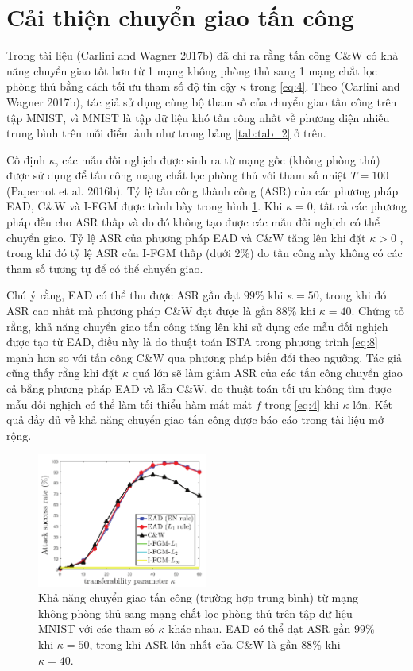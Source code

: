 \section{Cải thiện chuyển giao tấn công}
Trong tài liệu (Carlini and Wagner 2017b) đã chỉ ra rằng tấn công C\&W có khả năng chuyển giao tốt hơn  từ 1 mạng không phòng thủ sang 1 mạng chắt lọc phòng thủ bằng cách tối ưu tham số độ tin cậy $\kappa$ trong \ref{eq:4}. Theo (Carlini and Wagner 2017b), tác giả sử dụng cùng bộ tham số của chuyển giao tấn công trên tập MNIST, vì MNIST là tập dữ liệu khó tấn công nhất về phương diện nhiễu trung bình trên mỗi điểm ảnh như trong bảng \ref{tab:tab_2} ở trên.

Cố định $\kappa$, các mẫu đối nghịch được sinh ra từ mạng gốc (không phòng thủ) được sử dụng để tấn công mạng chắt lọc phòng thủ với tham số nhiệt $T = 100$ (Papernot et al. 2016b). Tỷ lệ tấn công thành công (ASR) của các phương pháp EAD, C\&W và I-FGM được trình bày trong hình \ref{fig:fg_04}. Khi $\kappa = 0$, tất cả các phương pháp đều cho ASR thấp và do đó không tạo được các mẫu đối nghịch có thể chuyển giao. Tỷ lệ ASR của phương pháp EAD và C\&W tăng lên khi đặt $\kappa > 0$ , trong khi đó tỷ lệ ASR của I-FGM thấp (dưới $2\%$) do tấn công này không có các tham số tương tự để có thể chuyển giao.

Chú ý rằng, EAD có thể thu được ASR gần đạt $99\%$ khi $\kappa = 50$, trong khi đó ASR cao nhất mà phương pháp C\&W đạt được là gần $88\%$ khi $\kappa = 40$. Chứng tỏ rằng, khả năng chuyển giao tấn công tăng lên khi sử dụng các mẫu đối nghịch được tạo từ EAD, điều này là do thuật toán ISTA trong phương trình \ref{eq:8} mạnh hơn so với tấn công C\&W qua phương pháp biến đổi theo ngưỡng. Tác giả cũng thấy rằng khi đặt $\kappa$ quá lớn sẽ làm giảm ASR của các tấn công chuyển giao cả bằng phương pháp EAD và lẫn C\&W, do thuật toán tối ưu không tìm được mẫu đối nghịch có thể làm tối thiểu hàm mất mát $f$ trong \ref{eq:4} khi $\kappa$ lớn. Kết quả đầy đủ về khả năng chuyển giao tấn công được báo cáo trong tài liệu mở rộng.

\begin{figure}[H] %
    \centering %
    \includegraphics[width=0.5\textwidth]{assets/fig_04.png} 
    \caption{Khả năng chuyển giao tấn công (trường hợp trung bình) từ mạng không phòng thủ sang mạng chắt lọc phòng thủ  trên tập dữ liệu MNIST với các tham số $\kappa$ khác nhau. EAD có thể đạt ASR gần $99\%$ khi $\kappa = 50$, trong khi ASR lớn nhất của C\&W là gần $88\%$ khi $\kappa=40$.} %
    \label{fig:fg_04}
\end{figure}
